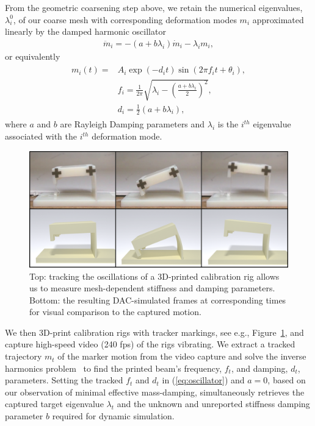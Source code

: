 From the geometric coarsening step above, we retain the numerical eigenvalues, $\lambda_i^0$, of our coarse mesh with corresponding deformation modes $m_i$ approximated linearly by the damped harmonic oscillator~\cite{Anonymous:TmbCyHDJ} 
\begin{align}
\ddot m_i = -(a + b \lambda_i ) \dot m_i - \lambda_i m_i,
\end{align}
or equivalently 
\begin{align}
\begin{split}
m_i(t) = &A_i\exp(-d_i t)\sin(2 \pi f_it+ \theta_i),\\
&f_i = \frac{1}{2\pi}\sqrt{\lambda_i - (\frac{a+ b \lambda_i}{2})^2},\\
&d_i=\frac{1}{2}(a + b \lambda_i),
\label{eq:oscillator}
\end{split}
\end{align} where $a$ and $b$ are Rayleigh Damping parameters and $\lambda_i$ is the $i^{th}$ eigenvalue associated with the $i^{th}$ deformation mode.

\begin{figure}
	\centering
	\includegraphics[width=0.6\columnwidth]{images/calibrationfig.png}
	\caption{Top: tracking the oscillations of a 3D-printed calibration rig allows us to measure mesh-dependent stiffness and damping parameters. Bottom: the resulting DAC-simulated frames at corresponding times for visual comparison to the captured motion.}
	\label{fig:calibrationRig}
\end{figure}

We then 3D-print calibration rigs with tracker markings, see e.g., Figure~\ref{fig:calibrationRig}, and capture high-speed video (240 fps) of the rigs vibrating.  
We extract a tracked trajectory $m_t$ of the marker motion from the video capture and solve the inverse harmonics problem~\citep{Mandelshtam:1997gr} to find the printed beam's frequency, $f_t$, and damping, $d_t$, parameters. Setting the tracked $f_t $ and $d_t$ in (\ref{eq:oscillator}) and $a=0$, based on our observation of minimal effective mass-damping, simultaneously retrieves the captured target eigenvalue $\lambda_t$ and the unknown and unreported stiffness damping parameter $b$ required for dynamic simulation. 

